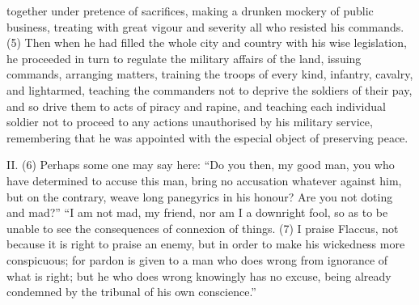 together under pretence of sacrifices, making a drunken mockery of public business, treating with
great vigour and severity all who resisted his commands. (5) Then when he had filled the whole city
and country with his wise legislation, he proceeded in turn to regulate the military affairs of the land,
issuing commands, arranging matters, training the troops of every kind, infantry, cavalry, and
lightarmed, teaching the commanders not to deprive the soldiers of their pay, and so drive them to
acts of piracy and rapine, and teaching each individual soldier not to proceed to any actions
unauthorised by his military service, remembering that he was appointed with the especial object of
preserving peace.

II. (6) Perhaps some one may say here: ``Do you then, my good man, you who have determined to
accuse this man, bring no accusation whatever against him, but on the contrary, weave long
panegyrics in his honour? Are you not doting and mad?'' ``I am not mad, my friend, nor am I a
downright fool, so as to be unable to see the consequences of connexion of things. (7) I praise
Flaccus, not because it is right to praise an enemy, but in order to make his wickedness more
conspicuous; for pardon is given to a man who does wrong from ignorance of what is right; but he
who does wrong knowingly has no excuse, being already condemned by the tribunal of his own
conscience.''

